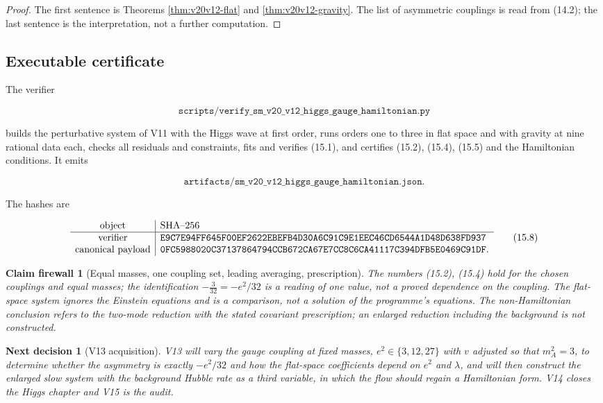 \documentclass[11pt]{article}
\newtheorem{firewall}[theorem]{Claim firewall}
\newtheorem{decision}[theorem]{Next decision}
\theoremstyle{remark}
\begin{document}
\begin{proof}
The first sentence is Theorems \ref{thm:v20v12-flat} and
\ref{thm:v20v12-gravity}.  The list of asymmetric couplings is read
from (14.2); the last sentence is the interpretation, not a further
computation.
\end{proof}

\subsection{Executable certificate}

The verifier

\[
 \texttt{scripts/verify\_sm\_v20\_v12\_higgs\_gauge\_hamiltonian.py}  \tag{15.6}
\]

builds the perturbative system of V11 with the Higgs wave at first
order, runs orders one to three in flat space and with gravity at
nine rational data each, checks all residuals and constraints, fits
and verifies (15.1), and certifies (15.2), (15.4), (15.5) and the
Hamiltonian conditions.  It emits

\[
 \texttt{artifacts/sm\_v20\_v12\_higgs\_gauge\_hamiltonian.json}.     \tag{15.7}
\]

The hashes are

\[
\begin{array}{c|l}
\hbox{object}&\hbox{SHA--256}\\ \hline
\hbox{verifier}&
\texttt{E9C7E94FF645F00EF2622EBEFB4D30A6C91C9E1EEC46CD6544A1D48D638FD937}\\
\hbox{canonical payload}&
\texttt{0FC5988020C37137864794CCB672CA67E7CC8C6CA41117C394DFB5E0469C91DF}.
\end{array}                                                     \tag{15.8}
\]

\begin{firewall}[Equal masses, one coupling set, leading averaging, prescription]
\label{fire:v20v12}
The numbers (15.2), (15.4) hold for the chosen couplings and equal
masses; the identification \(-\tfrac3{32}=-e^2/32\) is a reading of one
value, not a proved dependence on the coupling.  The flat-space
system ignores the Einstein equations and is a comparison, not a
solution of the programme's equations.  The non-Hamiltonian
conclusion refers to the two-mode reduction with the stated covariant
prescription; an enlarged reduction including the background is not
constructed.
\end{firewall}

\begin{decision}[V13 acquisition]
\label{dec:v20v12-next}
V13 will vary the gauge coupling at fixed masses, \(e^2\in\{3,12,27\}\)
with \(v\) adjusted so that \(m_A^2=3\), to determine whether the
asymmetry is exactly \(-e^2/32\) and how the flat-space coefficients
depend on \(e^2\) and \(\lambda\), and will then construct the enlarged
slow system with the background Hubble rate as a third variable, in
which the flow should regain a Hamiltonian form.  V14 closes the
Higgs chapter and V15 is the audit.
\end{decision}
\end{document}
